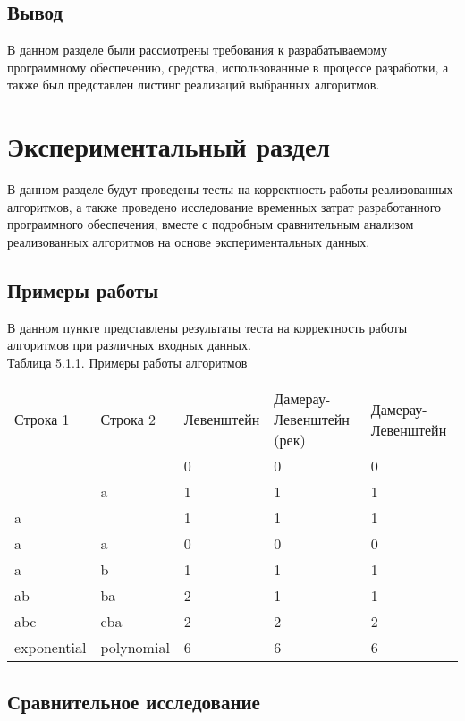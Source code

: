 \documentclass[a4paper, 14pt]{article}
\begin{document}
	\subsection{Вывод}
	
	В данном разделе были рассмотрены требования к разрабатываемому программному обеспечению, средства, использованные в процессе разработки, а также был представлен листинг реализаций выбранных алгоритмов.

	\newpage
	
	\section{Экспериментальный раздел}
	
	В данном разделе будут проведены тесты на корректность работы реализованных алгоритмов, а также проведено исследование временных затрат разработанного программного обеспечения, вместе с подробным сравнительным анализом реализованных алгоритмов на основе экспериментальных данных.
	
	\subsection{Примеры работы}
	
	В данном пункте представлены результаты теста на корректность работы алгоритмов при различных входных данных. \\
	
	\small Таблица 5.1.1. Примеры работы алгоритмов\normalsize\\
	
	\begin{tabular}{ | l | l | l | l | l |}
		Строка 1 & Строка 2  & Левенштейн & Дамерау-Левенштейн (рек) & Дамерау-Левенштейн \\
		 &  & 0 & 0 & 0 \\
		 & a & 1 & 1 & 1\\
		a &  & 1 & 1 & 1\\
		a & a & 0 & 0 & 0\\
		a &  b & 1 & 1 & 1\\
		ab & ba & 2 & 1 & 1\\
		abc & cba & 2 & 2 & 2\\
		exponential &  polynomial & 6 & 6 & 6\\
	\end{tabular}
	
	\subsection{Сравнительное исследование}
	
\end{document}
